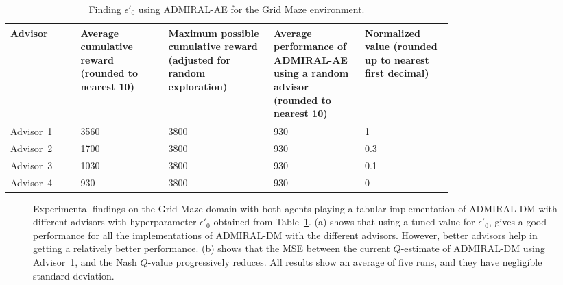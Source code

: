\documentclass[jair, twoside,11pt,theapa]{article}
\begin{document}
\begin{table}
\begin{center}
 \begin{tabular}{||p{0.12 \linewidth} |p{0.15 \linewidth} |p{0.18 \linewidth} |p{0.15 \linewidth} | p{0.15 \linewidth}||} 
 \hline
 Advisor & Average cumulative reward (rounded to nearest 10) & Maximum possible cumulative reward (adjusted for random exploration) & Average performance of ADMIRAL-AE using a random advisor (rounded to nearest 10) & Normalized value (rounded up to nearest first decimal) \\ [0.5ex] 
 \hline\hline
 Advisor~1 & 3560 & 3800 & 930 & 1 \\ 
 \hline
 Advisor~2 & 1700 & 3800 & 930 & 0.3 \\
 \hline
 Advisor~3 & 1030 & 3800 & 930 & 0.1  \\
 \hline
 Advisor~4 & 930 & 3800 & 930 & 0  \\[1ex] 
 \hline
\end{tabular}
\caption{Finding $\epsilon'_0$ using ADMIRAL-AE for the Grid Maze environment.}
\label{tab:mazeepsilon}
\end{center}
\end{table}





\begin{figure}
    \centering
	 \quad
    \caption{Experimental findings on the Grid Maze domain with both agents playing a tabular implementation of ADMIRAL-DM with different advisors with hyperparameter $\epsilon'_0$ obtained from Table~\ref{tab:mazeepsilon}. (a) shows that using a tuned value for $\epsilon'_0$, gives a good performance for all the implementations of ADMIRAL-DM with the different advisors. However, better advisors help in getting a relatively better performance. (b) shows that the MSE between the current $Q$-estimate of ADMIRAL-DM using Advisor~1, and the Nash $Q$-value progressively reduces. All results show an average of five runs, and they have negligible standard deviation.}%
	\label{fig:gridmazesarsa}
\end{figure}
\end{document}
